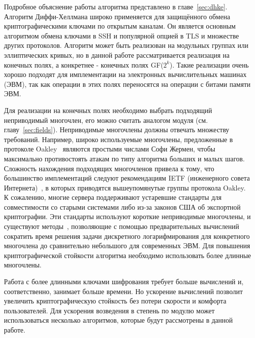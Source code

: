 \documentclass[times,specification,annotation]{itmo-student-thesis}
\begin{document}
Подробное объяснение работы алгоритма представлено в главе~\ref{sec:dhke}.
Алгоритм Диффи-Хеллмана широко применяется для защищённого обмена криптографическими ключами
по открытым каналам.
Он является основным алгоритмом обмена ключами в SSH и популярной опцией в TLS и множестве других протоколов.
Алгоритм может быть реализован на модульных группах или эллиптических кривых, но в данной работе рассматривается
реализация на конечных полях, а конкретнее - конечных полях GF($2^k$).
Такие реализации очень хорошо подходят для имплементации на электронных вычислительных машинах (ЭВМ),
так как операции в этих полях переносятся на операции с битами памяти ЭВМ.

Для реализации на конечных полях необходимо выбрать подходящий неприводимый многочлен, его можно считать аналогом модуля (см. главу~\ref{sec:fields}).
Неприводимые многочлены должны отвечать множеству требований.
Например, широко используемые многочлены, предложенные в протоколе Oakley~\cite{rfc2412} являются простыми числами
Софи Жермен, чтобы максимально противостоять атакам по типу алгоритма больших и малых шагов.
Сложность нахождения подходящих многочленов привела к тому, что большинство имплементаций следуют рекомендациям
IETF (инженерного совета Интернета)~\cite{rfc7296}, в которых приводятся вышеупомянутые группы протокола Oakley.
К сожалению, многие сервера поддерживают устаревшие стандарты для совместимости со старыми системами либо
из-за законов США об экспортной криптографии.
Эти стандарты используют короткие неприводимые многочлены, и существуют методы~\cite{adr15},
позволяющие с помощью предварительных вычислений сократить время решения задачи дискретного логарифмирования для
конкретного многочлена до сравнительно небольшого для современных ЭВМ.
Для повышения криптографической стойкости алгоритма необходимо использовать более длинные многочлены.\par
Работа с более длинными ключами шифрования требует больше вычислений и, соответственно, занимает больше времени.
Но ускорение вычислений позволит увеличить криптографическую стойкость без потери скорости и комфорта пользователей.
Для ускорения возведения в степень по модулю может использоваться несколько алгоритмов, которые будут рассмотрены в
данной работе.
\end{document}
